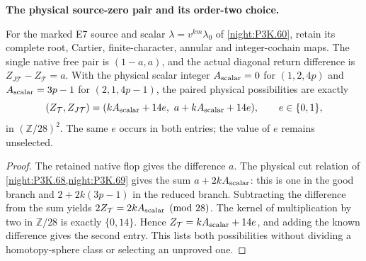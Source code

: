 \begin{proposition}\label{iv:correction:P3K.60}
\textbf{The physical source-zero pair and its order-two choice.}\par
For the marked E7 source and scalar
\(\lambda=v^{km}\lambda_0\) of \cref{night:P3K.60},
retain its complete root, Cartier, finite-character,
annular and integer-cochain maps. The single native
free pair is \((1-a,a)\), and the actual diagonal
return difference is \(Z_{J\mathcal T}-Z_{\mathcal T}=a\).
With the physical scalar integer
\(A_{\rm scalar}=0\) for \((1,2,4p)\) and
\(A_{\rm scalar}=3p-1\) for \((2,1,4p-1)\), the
paired physical possibilities are exactly
\[
 (Z_{\mathcal T},Z_{J\mathcal T})=
 (kA_{\rm scalar}+14e,\ a+kA_{\rm scalar}+14e),
 \qquad e\in\{0,1\},
\]
in \((\mathbb Z/28)^2\). The same \(e\) occurs in
both entries; the value of \(e\) remains unselected.
\end{proposition}
\begin{proof}
The retained native flop gives the difference
\(a\). The physical cut relation of
\cref{night:P3K.68,night:P3K.69} gives the sum
\(a+2kA_{\rm scalar}\): this is one in the good
branch and \(2+2k(3p-1)\) in the reduced branch.
Subtracting the difference from the sum yields
\(2Z_{\mathcal T}=2kA_{\rm scalar}\pmod{28}\).
The kernel of multiplication by two in \(\mathbb Z/28\)
is exactly \(\{0,14\}\). Hence
\(Z_{\mathcal T}=kA_{\rm scalar}+14e\), and adding
the known difference gives the second entry.
This lists both possibilities without dividing a
homotopy-sphere class or selecting an unproved one.
\end{proof}



